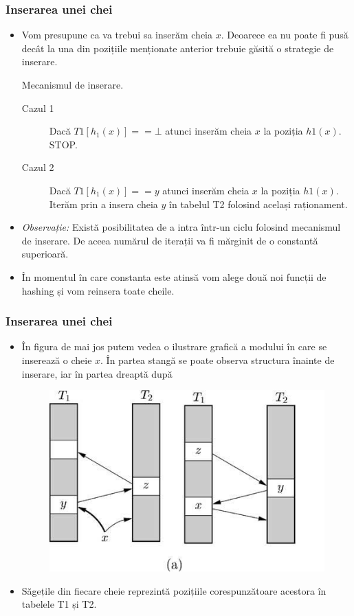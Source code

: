 \documentclass{beamer}
\begin{document}
\begin{frame}
\frametitle{Inserarea unei chei}
\begin{itemize}
\item Vom presupune ca va trebui sa inserăm cheia $x$. Deoarece ea nu poate fi pusă decât la una din pozițiile menționate anterior trebuie găsită o strategie de inserare.
\begin{block}{Mecanismul de inserare.}


\begin{description}
  \item[Cazul 1] Dacă $T1[h_1(x)] == \bot$ atunci inserăm cheia $x$ la poziția $h1(x)$. STOP.
  \item[Cazul 2] Dacă $T1[h_1(x)] == y$ atunci inserăm cheia $x$ la poziția $h1(x)$. Iterăm prin a insera cheia $y$ în tabelul T2 folosind același raționament.
\end{description}
\end{block}

\item \textit{Observație:} Există posibilitatea de a intra într-un ciclu folosind mecanismul de inserare. De aceea numărul de iterații va fi mărginit de o constantă superioară.
\item În momentul în care constanta este atinsă vom alege două noi funcții de hashing și vom reinsera toate cheile.
\end{itemize}
\end{frame}
\begin{frame}
\frametitle{Inserarea unei chei}
\begin{itemize}
\item În figura de mai jos putem vedea o ilustrare grafică a modului în care se inserează o cheie $x$. În partea stangă se poate observa structura înainte de inserare, iar în partea dreaptă după 

\begin{figure}
\includegraphics[width=0.4\linewidth]{cuckoo.jpg}
\end{figure}

\item Săgețile din fiecare cheie reprezintă pozițiile corespunzătoare acestora în tabelele T1 și T2.
\end{itemize}
\end{frame}
\end{document}
